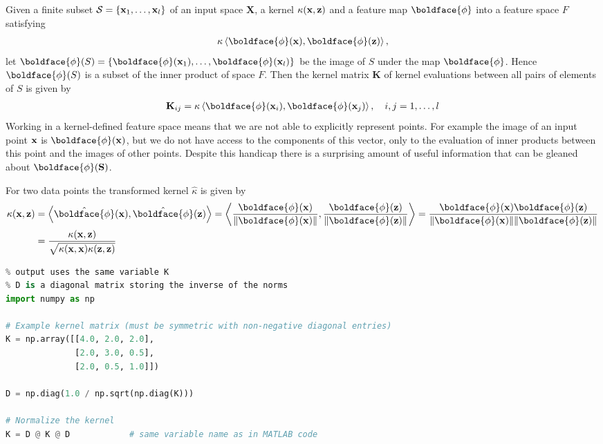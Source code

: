 Given a finite subset $\mathcal{S} = \{{\mathbf{x}}_1, \dots, {\mathbf{x}}_{l}\}$ of an input space $\mathbf{X}$, a kernel $\kappa ({\mathbf{x}}, {\mathbf{z}})$ and a feature map $\boldface{\phi}$ into a feature space $F$ satisfying
\begin{align*}
	\kappa \left<\boldface{\phi}(\rvx), \boldface{\phi}(\rvz)\right>,
\end{align*}
let $\boldface{\phi}(S) = \{\boldface{\phi}(\rvx_1), \dots, \boldface{\phi}(\rvx_l)\}$ be the image of $S$ under the map $\boldface{\phi}$. Hence $\boldface{\phi}(S)$ is a subset of the inner product of space $F$. Then the kernel matrix $\mathbf{K}$ of kernel evaluations between all pairs of elements of $S$ is given by
\begin{align*}
	\mathbf{K}_{ij} =\kappa \left<\boldface{\phi}(\rvx_i), \boldface{\phi}(\rvx_j)\right>, \quad i,j=1,\dots,l
\end{align*}
Working in a kernel-defined feature space means that we are not able to explicitly represent points. For example the image of an input point ${\mathbf{x}}$ is $\boldface{\phi}(\rvx)$, but we do not have access to the components of this vector, only to the evaluation of inner products between this point and the images of other points. Despite this handicap there is a surprising amount of useful information that can be gleaned about $\boldface{\phi}(\mathbf{S})$.

For two data points the transformed kernel $\hat{\kappa}$ is given by
\begin{align*}
\kappa(\rvx, \rvz) &= \left<\hat{\boldface{\phi}}(\rvx), \hat{\boldface{\phi}}(\rvz)\right> = \left<\frac{\boldface{\phi}(\rvx)}{\|\boldface{\phi}(\rvx)\|}, \frac{\boldface{\phi}(\rvz)}{\|\boldface{\phi}(\rvz)\|}\right> = \frac{\boldface{\phi}(\rvx)\boldface{\phi}(\rvz)}{\|\boldface{\phi}(\rvx)\|\|\boldface{\phi}(\rvz)\|}\\
				   &= \frac{\kappa(\rvx, \rvz)}{\sqrt{\kappa(\rvx, \rvx)\kappa(\rvz, \rvz)}}
\end{align*}

\begin{lstlisting}[language=Python]
% original kernel matrix stored in variable K
% output uses the same variable K
% D is a diagonal matrix storing the inverse of the norms
import numpy as np

# Example kernel matrix (must be symmetric with non‑negative diagonal entries)
K = np.array([[4.0, 2.0, 2.0],
              [2.0, 3.0, 0.5],
              [2.0, 0.5, 1.0]])

D = np.diag(1.0 / np.sqrt(np.diag(K)))

# Normalize the kernel
K = D @ K @ D            # same variable name as in MATLAB code
\end{lstlisting}

